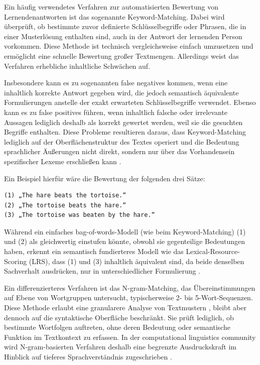 \documentclass[a4paper,12pt]{article}
\begin{document}
Ein häufig verwendetes Verfahren zur automatisierten Bewertung von Lernendenantworten ist das sogenannte Keyword-Matching. Dabei wird überprüft, ob bestimmte zuvor definierte Schlüsselbegriffe oder Phrasen, die in einer Musterlösung enthalten sind, auch in der Antwort der lernenden Person vorkommen. Diese Methode ist technisch vergleichsweise einfach umzusetzen und ermöglicht eine schnelle Bewertung großer Textmengen. Allerdings weist das Verfahren erhebliche inhaltliche Schwächen auf.

Insbesondere kann es zu sogenannten false negatives kommen, wenn eine inhaltlich korrekte Antwort gegeben wird, die jedoch semantisch äquivalente Formulierungen anstelle der exakt erwarteten Schlüsselbegriffe verwendet. Ebenso kann es zu false positives führen, wenn inhaltlich falsche oder irrelevante Aussagen lediglich deshalb als korrekt gewertet werden, weil sie die gesuchten Begriffe enthalten. Diese Probleme resultieren daraus, dass Keyword-Matching lediglich auf der Oberflächenstruktur des Textes operiert und die Bedeutung sprachlicher Äußerungen nicht direkt, sondern nur über das Vorhandensein spezifischer Lexeme erschließen kann \parencite{burrows}.

Ein Beispiel hierfür wäre die Bewertung der folgenden drei Sätze:
\begin{verbatim}
(1) „The hare beats the tortoise.“
(2) „The tortoise beats the hare.“
(3) „The tortoise was beaten by the hare.“
\end{verbatim}
Während ein einfaches bag-of-words-Modell (wie beim Keyword-Matching) (1) und (2) als gleichwertig einstufen könnte, obwohl sie gegenteilige Bedeutungen haben, erkennt ein semantisch fundierteres Modell wie das Lexical-Resource-Scoring (LRS), dass (1) und (3) inhaltlich äquivalent sind, da beide denselben Sachverhalt ausdrücken, nur in unterschiedlicher Formulierung \parencite[S. 74]{burrows}.

Ein differenzierteres Verfahren ist das N-gram-Matching, das Übereinstimmungen auf Ebene von Wortgruppen untersucht, typischerweise 2- bis 5-Wort-Sequenzen. Diese Methode erlaubt eine granularere Analyse von Textmustern \parencite{jurafsky}, bleibt aber dennoch auf die syntaktische Oberfläche beschränkt. Sie prüft lediglich, ob bestimmte Wortfolgen auftreten, ohne deren Bedeutung oder semantische Funktion im Textkontext zu erfassen. In der computational linguistics community wird N-gram-basierten Verfahren deshalb eine begrenzte Ausdruckskraft im Hinblick auf tieferes Sprachverständnis zugeschrieben \parencite{mitkov}.
\end{document}
